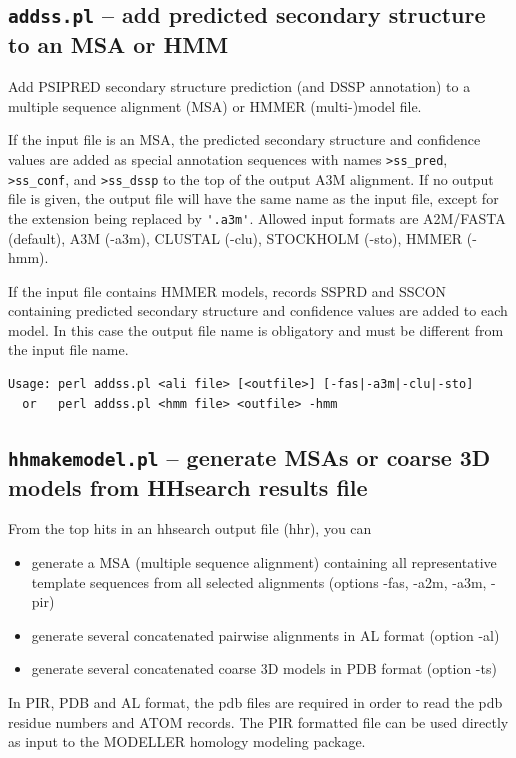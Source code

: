 \documentclass[11pt,a4paper]{article}
\begin{document}
\subsection{{\tt addss.pl} -- add predicted secondary structure to an MSA or HMM}
Add PSIPRED secondary structure prediction (and DSSP annotation) to a multiple sequence alignment (MSA) 
or HMMER (multi-)model file. 

If the input file is an MSA, the predicted secondary structure and confidence values are added as 
special annotation sequences with names \verb`>ss_pred`, \verb`>ss_conf`, and \verb`>ss_dssp` to the top of the output 
A3M alignment. If no output file is given, the output file will have the same name as the input file, 
except for the extension being replaced by \verb`'.a3m'`. Allowed input formats are A2M/FASTA (default), 
A3M (-a3m), CLUSTAL (-clu), STOCKHOLM (-sto), HMMER (-hmm).

If the input file contains HMMER models, records SSPRD and SSCON containing predicted secondary 
structure and confidence values are added to each model. In this case the output file name is 
obligatory and must be different from the input file name.

\small 
\begin{verbatim}
Usage: perl addss.pl <ali file> [<outfile>] [-fas|-a3m|-clu|-sto]  
  or   perl addss.pl <hmm file> <outfile> -hmm  
\end{verbatim} 
\normalsize


\subsection{{\tt hhmakemodel.pl} -- generate MSAs or coarse 3D models from HHsearch results file}

From the top hits in an hhsearch output file (hhr), you can  
\begin{itemize}
\item{generate a MSA (multiple sequence alignment) containing all representative 
template sequences from all selected alignments (options -fas, -a2m, -a3m, -pir)}
\item{generate several concatenated pairwise alignments in AL format (option -al)}
\item{generate several concatenated coarse 3D models in PDB format (option -ts)}
\end{itemize}
In PIR, PDB and AL format, the pdb files are required in order to read the pdb residue numbers 
and ATOM records. The PIR formatted file can be used directly as input to the MODELLER\cite{Sali:1993} 
homology modeling package.
\end{document}
